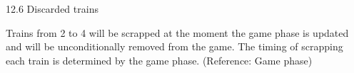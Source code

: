 \documentclass{article}
\begin{document}
\begin{CJK}{UTF8}{min}
12.6 Discarded trains

Trains from 2 to 4 will be scrapped at the moment the game phase is
updated and will be unconditionally removed from the game. The timing
of scrapping each train is determined by the game phase. (Reference:
Game phase)















\end{CJK}
\end{document}
